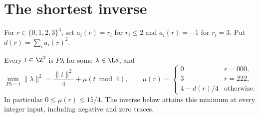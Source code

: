 \section{The shortest inverse}
For $r\in\{0,1,2,3\}^3$, set $a_i(r)=r_i$ for $r_i\le2$ and $a_i(r)=-1$ for $r_i=3$. Put $d(r)=\sum_i a_i(r)^2$.
\begin{theorem}\label{thm:shortest}
Every $t\in\Z^3$ is $P\lambda$ for some $\lambda\in\La$, and
\[
\boxed{\min_{P\lambda=t}\|\lambda\|^2
=\frac{\|t\|^2}{4}+\mu(t\bmod4),}
\qquad
\mu(r)=\begin{cases}
0&r=000,\\
3&r=222,\\
4-d(r)/4&\text{otherwise}.
\end{cases}
\]
In particular $0\le\mu(r)\le15/4$. The inverse below attains this minimum at every integer input, including negative and zero traces.
\end{theorem}
